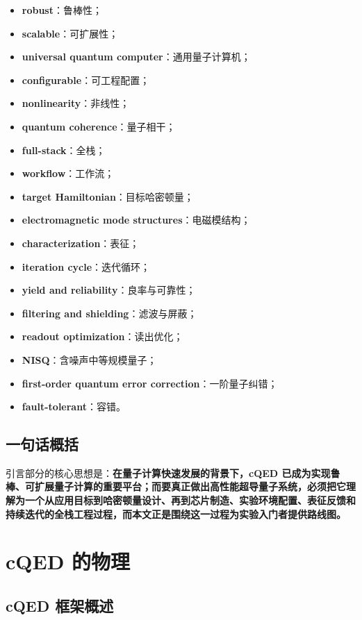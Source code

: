 \documentclass[12pt,a4paper,oneside]{ctexbook}
\begin{document}
\begin{itemize}[leftmargin=2em]
    \item \textbf{robust}：鲁棒性；
    \item \textbf{scalable}：可扩展性；
    \item \textbf{universal quantum computer}：通用量子计算机；
    \item \textbf{configurable}：可工程配置；
    \item \textbf{nonlinearity}：非线性；
    \item \textbf{quantum coherence}：量子相干；
    \item \textbf{full-stack}：全栈；
    \item \textbf{workflow}：工作流；
    \item \textbf{target Hamiltonian}：目标哈密顿量；
    \item \textbf{electromagnetic mode structures}：电磁模结构；
    \item \textbf{characterization}：表征；
    \item \textbf{iteration cycle}：迭代循环；
    \item \textbf{yield and reliability}：良率与可靠性；
    \item \textbf{filtering and shielding}：滤波与屏蔽；
    \item \textbf{readout optimization}：读出优化；
    \item \textbf{NISQ}：含噪声中等规模量子；
    \item \textbf{first-order quantum error correction}：一阶量子纠错；
    \item \textbf{fault-tolerant}：容错。
\end{itemize}

\subsection{一句话概括}

引言部分的核心思想是：\textbf{在量子计算快速发展的背景下，cQED 已成为实现鲁棒、可扩展量子计算的重要平台；而要真正做出高性能超导量子系统，必须把它理解为一个从应用目标到哈密顿量设计、再到芯片制造、实验环境配置、表征反馈和持续迭代的全栈工程过程，而本文正是围绕这一过程为实验入门者提供路线图。}
\section{cQED 的物理}

\subsection{cQED 框架概述}
\end{document}
